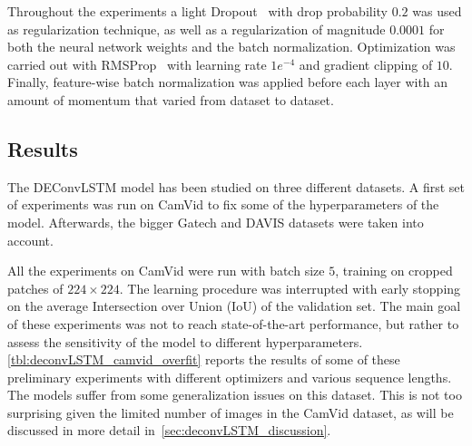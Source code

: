 \begin{table}[t]
    \caption{TransConvLSTM hyperparameters. Number of filters per
        sublayer~(\textbf{nf}), filters size per sublayer~(\textbf{fs}) and
        stride per sublayer~(\textbf{st}).}
    \label{tbl:deconvLSTM_dec_hyperparams}
\end{table}

Throughout the experiments a light Dropout~\citep{Srivastava14} with drop
probability $0.2$ was used as regularization technique, as well as a
regularization of magnitude $0.0001$ for both the neural network weights and
the batch normalization. Optimization was carried out with
RMSProp~\citep{tieleman2012lecture} with learning rate $1e^{-4}$ and gradient
clipping of $10$. Finally, feature-wise batch normalization was applied before
each layer with an amount of momentum that varied from dataset to dataset.


\subsection{Results}\label{sec:deconvLSTM_results}

The DEConvLSTM model has been studied on three different datasets. A first
set of experiments was run on CamVid to fix some of the hyperparameters of the
model. Afterwards, the bigger Gatech and DAVIS datasets were taken into
account.

All the experiments on CamVid were run with batch size $5$, training on cropped
patches of $224 \times 224$. The learning procedure was interrupted with early
stopping on the average Intersection over Union (IoU) of the validation set.
The main goal of these experiments was not to reach state-of-the-art
performance, but rather to assess the sensitivity of the model to different
hyperparameters. \autoref{tbl:deconvLSTM_camvid_overfit} reports the results of
some of these preliminary experiments with different optimizers and various
sequence lengths. The models suffer from some generalization issues on this
dataset. This is not too surprising given the limited number of images in the
CamVid dataset, as will be discussed in more detail
in~\autoref{sec:deconvLSTM_discussion}.

